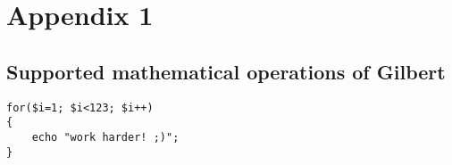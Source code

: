 \chapter{Appendix 1}
\label{appendix:Gilbert}
\appendix


\section{Supported mathematical operations of Gilbert}
\label{appendix:GilbertOps}

\lstset{language=PHP}
\begin{lstlisting}
for($i=1; $i<123; $i++)
{
    echo "work harder! ;)";
}
\end{lstlisting}